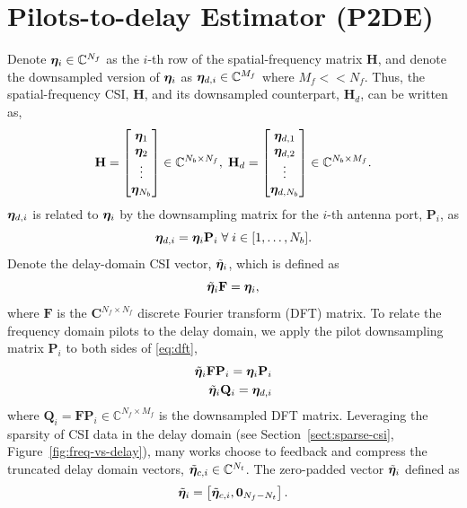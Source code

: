 \section{Pilots-to-delay Estimator (P2DE)}
\label{sect:p2de}

Denote $\boldsymbol{\eta}_i \in \mathbb{C}^{N_f}$ as the $i$-th row of the spatial-frequency matrix $\mathbf{H}$, and denote the downsampled version of $\boldsymbol{\eta}_i$ as $\boldsymbol{\eta}_{d,i} \in \mathbb{C}^{M_f}$ where $M_f << N_f$. Thus, the spatial-frequency CSI, $\mathbf{H}$, and its downsampled counterpart, $\mathbf{H}_d$, can be written as,
\begin{equation}
	\mathbf{H} = \begin{bmatrix} \boldsymbol{\eta}_1 \\ \boldsymbol{\eta}_2 \\ \vdots \\ \boldsymbol{\eta}_{N_b} \\\end{bmatrix}\in\mathbb{C}^{N_b \times N_f}, \; \mathbf{H}_d = \begin{bmatrix} \boldsymbol{\eta}_{d,1} \\ \boldsymbol{\eta}_{d,2} \\ \vdots \\ \boldsymbol{\eta}_{d,N_b} \\\end{bmatrix}\in\mathbb{C}^{N_b \times M_f}.
\end{equation}
$\boldsymbol{\eta}_{d,i}$ is related to $\boldsymbol{\eta}_i$ by the downsampling matrix for the $i$-th antenna port, $\mathbf{P}_i$, as
\begin{equation}
	\boldsymbol{\eta}_{d,i} = \boldsymbol{\eta}_i \mathbf{P}_i \; \forall \; i \in [1, \dots, N_b].
\end{equation}
Denote the delay-domain CSI vector, $\tilde{\boldsymbol{\eta}}_i$, which is defined as
\begin{equation}
	\tilde{\boldsymbol{\eta}}_{i}\mathbf{F} = \boldsymbol{\eta}_i, \label{eq:dft}
\end{equation}
where $\mathbf{F}$ is the $\mathbf{C}^{N_f \times N_f}$ discrete Fourier transform (DFT) matrix. To relate the frequency domain pilots to the delay domain, we apply the pilot downsampling matrix $\mathbf{P}_i$ to both sides of \ref{eq:dft},
\begin{align}
	\tilde{\boldsymbol{\eta}}_{i}\mathbf{F}\mathbf{P}_i = \boldsymbol{\eta}_i\mathbf{P}_i \nonumber \\
	\tilde{\boldsymbol{\eta}}_{i}\mathbf{Q}_i = \boldsymbol{\eta}_{d,i} \label{eq:qmat}
\end{align}
where $\mathbf{Q}_i=\mathbf{F}\mathbf{P}_i\in\mathbb{C}^{N_f\times M_f}$ is the downsampled DFT matrix.
Leveraging the sparsity of CSI data in the delay domain (see Section~\ref{sect:sparse-csi}, Figure~\ref{fig:freq-vs-delay}), many works choose to feedback and compress the truncated delay domain vectors, $\tilde{\boldsymbol{\eta}}_{c,i}\in\mathbb{C}^{N_t}$. The zero-padded vector $\tilde{\boldsymbol{\eta}}_{i}$ defined as
\begin{align} 
	\tilde{\boldsymbol{\eta}}_{i} = \left[\tilde{\boldsymbol{\eta}}_{c,i}, \mathbf{0}_{N_f - N_t}\right]. \label{eq:p2d_short}
\end{align}

